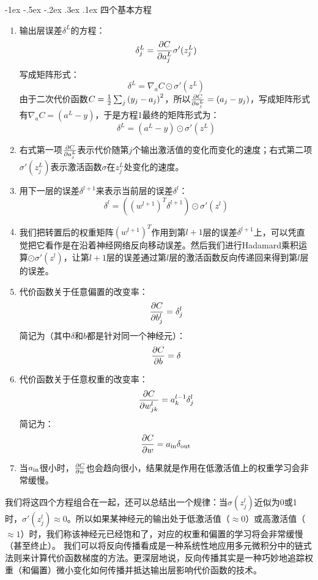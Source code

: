 \documentclass[a4paper, 11pt]{article}
\makeatletter
\newcommand{\xiaosihao}{\fontsize{12pt}{\baselineskip}\selectfont}
\renewcommand\subsubsection{\@startsection{subsubsection}{1}{\z@}%
{-1ex \@plus -.5ex \@minus -.2ex}%
{.3ex \@plus .1ex}%
{\normalfont\xiaosihao\CJKfamily{hei}}}
\makeatother
\begin{document}
\begin{CJK*}{GBK}{song}
\subsubsection{四个基本方程}
\begin{enumerate}[leftmargin=35pt,labelwidth=30pt]
\renewcommand{\labelenumi}{方程1:}
\item 输出层误差${\delta ^L}$的方程：
$$\delta _j^L = {{\partial C} \over {\partial a_j^L}}\sigma '(z_j^L)$$
写成矩阵形式：
$${\delta ^L} = {\nabla _a}C \odot \sigma '({z^L})$$
由于二次代价函数$C = {1 \over 2}\sum\nolimits_j {{{({y_j} - {a_j})}^2}} $，所以${{\partial C} \over {\partial a_j^L}} = ({a_j} - {y_j})$，写成矩阵形式有${\nabla _a}C = ({a^L} - y)$，于是方程1最终的矩阵形式为：
$${\delta ^L} = ({a^L} - y) \odot \sigma '({z^L})$$
\renewcommand{\labelenumi}{解释:}
\item 右式第一项${{\partial C} \over {\partial a_j^L}}$表示代价随第$j$个输出激活值的变化而变化的速度；右式第二项$\sigma '(z_j^L)$表示激活函数$\sigma$在$z_j^L$处变化的速度。
\renewcommand{\labelenumi}{方程2:}
\item 用下一层的误差${\delta ^{l+1}}$来表示当前层的误差${\delta ^l}$：
$${\delta ^l} = ({({w^{l + 1}})^T}{\delta ^{l + 1}}) \odot \sigma '({z^l})$$
\renewcommand{\labelenumi}{解释:}
\item 我们把转置后的权重矩阵${({w^{l + 1}})^T}$作用到第$l+1$层的误差${\delta ^{l + 1}}$上，可以凭直觉把它看作是在沿着神经网络反向移动误差。然后我们进行Hadamard乘积运算$\odot \sigma '({z^l})$，让第$l+1$层的误差通过第$l$层的激活函数反向传递回来得到第$l$层的误差。
\renewcommand{\labelenumi}{方程3:}
\item 代价函数关于任意偏置的改变率：
$${{\partial C} \over {\partial b_j^l}} = \delta _j^l$$
简记为（其中$\delta $和$b$都是针对同一个神经元）：
$${{\partial C} \over {\partial b}} = \delta $$
\renewcommand{\labelenumi}{方程4:}
\item 代价函数关于任意权重的改变率：
$${{\partial C} \over {\partial w_{jk}^l}} = a_k^{l - 1}\delta _j^l$$
简记为：
$${{\partial C} \over {\partial w}} = {a_{{\rm{in}}}}{\delta _{{\rm{out}}}}$$
\renewcommand{\labelenumi}{解释:}
\item 当${a_{{\rm{in}}}}$很小时，${{\partial C} \over {\partial w}}$也会趋向很小，结果就是作用在低激活值上的权重学习会非常缓慢。
\end{enumerate}

\quad\quad
我们将这四个方程组合在一起，还可以总结出一个规律：当$\sigma (z_j^l)$近似为0或1时，$\sigma '(z_j^l)\approx 0$。所以如果某神经元的输出处于低激活值（$ \approx 0$）或高激活值（$ \approx 1$）时，我们称该神经元已经饱和了，对应的权重和偏置的学习将会非常缓慢（甚至终止）。
\quad\quad
我们可以将反向传播看成是一种系统性地应用多元微积分中的链式法则来计算代价函数梯度的方法。更深层地说，反向传播其实是一种巧妙地追踪权重（和偏置）微小变化如何传播并抵达输出层影响代价函数的技术。

\end{CJK*}
\end{document}
